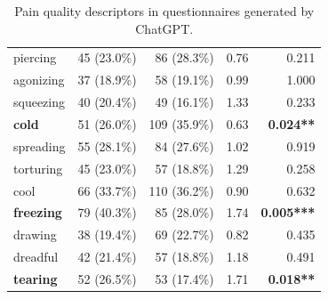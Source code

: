 \documentclass[preprint,12pt,authoryear]{elsarticle}
\begin{document}
\begin{table}[t!]
\begin{minipage}{0.49\textwidth}
{\begin{tabular}{lrrrr}
piercing & 45 (23.0\%) & 86 (28.3\%) & 0.76 & 0.211 \\
agonizing & 37 (18.9\%) & 58 (19.1\%) & 0.99 & 1.000 \\
squeezing & 40 (20.4\%) & 49 (16.1\%) & 1.33 & 0.233 \\
\textbf{cold} & 51 (26.0\%) & 109 (35.9\%) & 0.63 & \textbf{0.024**} \\
spreading & 55 (28.1\%) & 84 (27.6\%) & 1.02 & 0.919 \\
torturing & 45 (23.0\%) & 57 (18.8\%) & 1.29 & 0.258 \\
cool & 66 (33.7\%) & 110 (36.2\%) & 0.90 & 0.632 \\
\textbf{freezing} & 79 (40.3\%) & 85 (28.0\%) & 1.74 & \textbf{0.005***} \\
drawing & 38 (19.4\%) & 69 (22.7\%) & 0.82 & 0.435 \\
dreadful & 42 (21.4\%) & 57 (18.8\%) & 1.18 & 0.491 \\
\textbf{tearing} & 52 (26.5\%) & 53 (17.4\%) & 1.71 & \textbf{0.018**} \\
\bottomrule
\end{tabular}
}
\end{minipage}
\caption{Pain quality descriptors in questionnaires generated by ChatGPT.\label{tab_pain_qualiti}}
\end{table}
\end{document}
